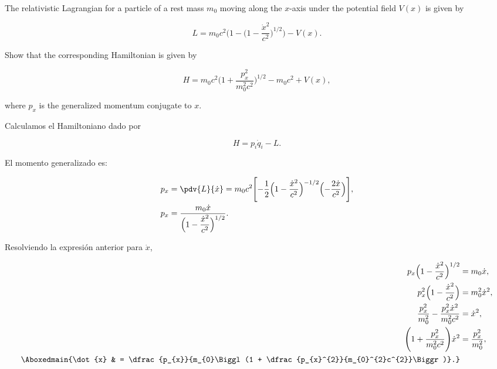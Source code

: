 \documentclass[../main.tex]{subfiles}
\begin{document}
\begin{problema}
	The relativistic Lagrangian for a particle of a rest mass \(m_{0}\)
	moving along the \(x\)-axis under the potential field \(V(x)\)
	is given by

	\begin{equation*}
		L = m_{0}c^{2} \Biggl(1 - \Biggl(1 - \dfrac{\dot{x}^{2}}{c^{2}}\Biggr)^{1/2}\Biggr) - V(x).
	\end{equation*}

	Show that the corresponding Hamiltonian is given by

	\begin{equation*}
		H = m_{0}c^{2} \Biggl(1 + \dfrac{p_{x}^{2}}{m_{0}^{2}c^{2}}\Biggr)^{1/2} - m_{0}c^{2} + V(x),
	\end{equation*}

	where \(p_{x}\) is the generalized momentum conjugate to \(x\).

	\startsolution

	Calculamos el Hamiltoniano dado por

	\begin{equation*}
		H = p_{i}\dot{q}_{i} - L.
	\end{equation*}

	El momento generalizado es:

	\begin{align*}
		p_{x} & = \pdv{L}{\dot{x}} = m_{0}c^{2}\Biggl[-\dfrac{1}{2}\Bigl(1 - \dfrac{\dot{x}^{2}}{c^{2}}\Bigr)^{-1/2}\Bigl(-\dfrac{2 \dot{x}}{c^{2}}\Bigr)\Biggr], \\
		p_{x} & = \dfrac{m_{0} \dot{x}}{\Bigl(1 - \dfrac{\dot{x}^{2}}{c^{2}}\Bigr)^{1/2}}.
	\end{align*}

	Resolviendo la expresión anterior para \(\dot{x}\),

	\begin{align}
		p_{x}\Bigl(1 - \dfrac{\dot{x}^{2}}{c^{2}}\Bigr)^{1/2}                        & = m_{0} \dot{x},\nonumber                                                   \\
		p_{x}^{2}\Bigl(1 - \dfrac{\dot{x}^{2}}{c^{2}}\Bigr)                          & = m_{0}^{2} \dot{x}^{2},\nonumber                                           \\
		\dfrac{p_{x}^{2}}{m_{0}^{2}} - \dfrac{p_{x}^{2} \dot{x}^{2}}{m_{0}^{2}c^{2}} & = \dot{x}^{2},\nonumber                                                     \\
		\Biggl(1 + \dfrac{p_{x}^{2}}{m_{0}^{2}c^{2}}\Biggr) \dot{x}^{2}              & = \dfrac{p_{x}^{2}}{m_{0}^{2}},\nonumber                                    \\
		\Aboxedmain{\dot{x}                                                          & = \dfrac{p_{x}}{m_{0}\Biggl(1 + \dfrac{p_{x}^{2}}{m_{0}^{2}c^{2}}\Biggr)}.}
		\label{eq:x-derivative}
	\end{align}


\end{problema}
\end{document}
